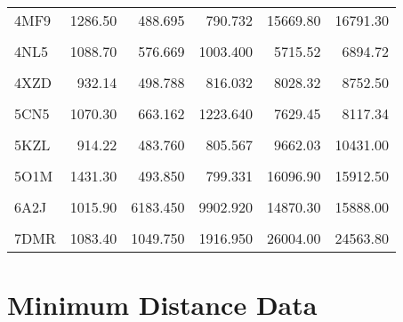 \begin{table}
{\begin{tabular}{lrrrrr}
				4MF9 & 1286.50 & 488.695 & 790.732 & 15669.80 & 16791.30\\
				\cellcolor{gray!6}{4MYP} & \cellcolor{gray!6}{610.72} & \cellcolor{gray!6}{963.019} & \cellcolor{gray!6}{1834.680} & \cellcolor{gray!6}{6285.40} & \cellcolor{gray!6}{7351.53}\\
				\addlinespace
				4NL5 & 1088.70 & 576.669 & 1003.400 & 5715.52 & 6894.72\\
				\cellcolor{gray!6}{4UZV} & \cellcolor{gray!6}{1184.10} & \cellcolor{gray!6}{526.584} & \cellcolor{gray!6}{844.058} & \cellcolor{gray!6}{7378.28} & \cellcolor{gray!6}{8322.74}\\
				4XZD & 932.14 & 498.788 & 816.032 & 8028.32 & 8752.50\\
				\cellcolor{gray!6}{4Y1Q} & \cellcolor{gray!6}{952.23} & \cellcolor{gray!6}{494.939} & \cellcolor{gray!6}{806.960} & \cellcolor{gray!6}{7905.84} & \cellcolor{gray!6}{8785.04}\\
				5CN5 & 1070.30 & 663.162 & 1223.640 & 7629.45 & 8117.34\\
				\addlinespace
				\cellcolor{gray!6}{5GJ3} & \cellcolor{gray!6}{1108.20} & \cellcolor{gray!6}{756.603} & \cellcolor{gray!6}{1131.670} & \cellcolor{gray!6}{11394.00} & \cellcolor{gray!6}{12591.80}\\
				5KZL & 914.22 & 483.760 & 805.567 & 9662.03 & 10431.00\\
				\cellcolor{gray!6}{5O1L} & \cellcolor{gray!6}{1438.70} & \cellcolor{gray!6}{801.519} & \cellcolor{gray!6}{1447.270} & \cellcolor{gray!6}{15538.20} & \cellcolor{gray!6}{16876.00}\\
				5O1M & 1431.30 & 493.850 & 799.331 & 16096.90 & 15912.50\\
				\cellcolor{gray!6}{5VEU} & \cellcolor{gray!6}{964.76} & \cellcolor{gray!6}{993.578} & \cellcolor{gray!6}{1502.660} & \cellcolor{gray!6}{20900.80} & \cellcolor{gray!6}{20425.90}\\
				\addlinespace
				6A2J & 1015.90 & 6183.450 & 9902.920 & 14870.30 & 15888.00\\
				\cellcolor{gray!6}{7C74} & \cellcolor{gray!6}{1155.10} & \cellcolor{gray!6}{497.527} & \cellcolor{gray!6}{820.381} & \cellcolor{gray!6}{26111.40} & \cellcolor{gray!6}{25094.20}\\
				7DMR & 1083.40 & 1049.750 & 1916.950 & 26004.00 & 24563.80\\
				\bottomrule
		\end{tabular}}
	\end{table}

\section{Minimum Distance Data} %


